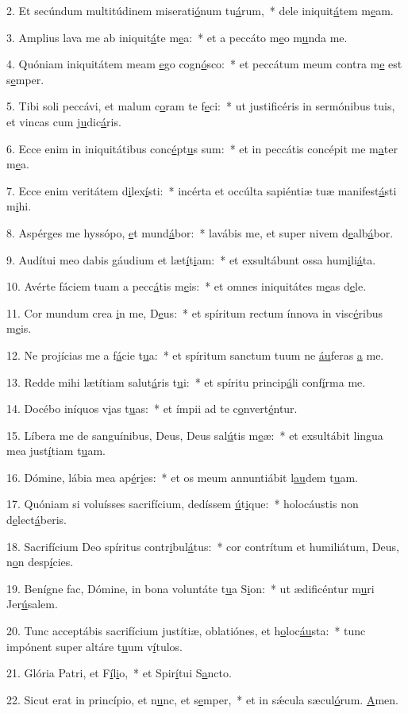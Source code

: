 2. Et secúndum multitúdinem miserati\uline{ó}num tu\uline{á}rum,~* dele iniquit\uline{á}tem m\uline{e}am.\par 
3. Amplius lava me ab iniquit\uline{á}te m\uline{e}a:~* et a peccáto m\uline{e}o m\uline{u}nda me.\par 
4. Quóniam iniquitátem meam \uline{e}go cogn\uline{ó}sco:~* et peccátum meum contra m\uline{e} est s\uline{e}mper.\par 
5. Tibi soli peccávi, et malum c\uline{o}ram te f\uline{e}ci:~* ut justificéris in sermónibus tuis, et vincas cum j\uline{u}dic\uline{á}ris.\par 
6. Ecce enim in iniquitátibus conc\uline{é}pt\uline{u}s sum:~* et in peccátis concépit me m\uline{a}ter m\uline{e}a.\par 
7. Ecce enim veritátem d\uline{i}lex\uline{í}sti:~* incérta et occúlta sapiéntiæ tuæ manifest\uline{á}sti m\uline{i}hi.\par 
8. Aspérges me hyssópo, \uline{e}t mund\uline{á}bor:~* lavábis me, et super nivem d\uline{e}alb\uline{á}bor.\par 
9. Audítui meo dabis gáudium et læt\uline{í}t\uline{i}am:~* et exsultábunt ossa hum\uline{i}li\uline{á}ta.\par 
10. Avérte fáciem tuam a pecc\uline{á}tis m\uline{e}is:~* et omnes iniquitátes m\uline{e}as d\uline{e}le.\par 
11. Cor mundum crea \uline{i}n me, D\uline{e}us:~* et spíritum rectum ínnova in visc\uline{é}ribus m\uline{e}is.\par 
12. Ne projícias me a f\uline{á}cie t\uline{u}a:~* et spíritum sanctum tuum ne \uline{áu}feras \uline{a} me.\par 
13. Redde mihi lætítiam salut\uline{á}ris t\uline{u}i:~* et spíritu princip\uline{á}li conf\uline{í}rma me.\par 
14. Docébo iníquos v\uline{i}as t\uline{u}as:~* et ímpii ad te c\uline{o}nvert\uline{é}ntur.\par 
15. Líbera me de sanguínibus, Deus, Deus sal\uline{ú}tis m\uline{e}æ:~* et exsultábit lingua mea just\uline{í}tiam t\uline{u}am.\par 
16. Dómine, lábia mea ap\uline{é}r\uline{i}es:~* et os meum annuntiábit l\uline{au}dem t\uline{u}am.\par 
17. Quóniam si voluísses sacrifícium, dedíssem \uline{ú}t\uline{i}que:~* holocáustis non d\uline{e}lect\uline{á}beris.\par 
18. Sacrifícium Deo spíritus contr\uline{i}bul\uline{á}tus:~* cor contrítum et humiliátum, Deus, n\uline{o}n desp\uline{í}cies.\par 
19. Benígne fac, Dómine, in bona voluntáte t\uline{u}a S\uline{i}on:~* ut ædificéntur m\uline{u}ri Jer\uline{ú}salem.\par 
20. Tunc acceptábis sacrifícium justítiæ, oblatiónes, et h\uline{o}loc\uline{áu}sta:~* tunc impónent super altáre t\uline{u}um v\uline{í}tulos.\par 
21. Glória Patri, et F\uline{í}l\uline{i}o,~* et Spir\uline{í}tui S\uline{a}ncto.\par 
22. Sicut erat in princípio, et n\uline{u}nc, et s\uline{e}mper,~* et in sǽcula sæcul\uline{ó}rum. \uline{A}men.\par 
